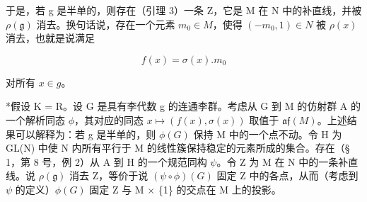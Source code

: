 于是，若 g 是半单的，则存在（引理 3）一条 Z，它是 M 在 N 中的补直线，并被 \(\rho(\mathfrak{g})\) 消去。换句话说，存在一个元素 \(m_{0} \in M\)，使得 \((-m_{0}, 1) \in N\) 被 \(\rho(x)\) 消去，也就是说满足

\[
f (x) = \sigma (x). m _ {0}\tag{2}
\]

对所有 \(x \in g\)。

*假设 K = R。设 G 是具有李代数 g 的连通李群。考虑从 G 到 M 的仿射群 A 的一个解析同态 \(\phi\)，其对应的同态 \(x \mapsto (f(x), \sigma(x))\) 取值于 \(\mathfrak{af}(M)\)。上述结果可以解释为：若 g 是半单的，则 \(\phi(G)\) 保持 M 中的一个点不动。令 H 为 GL(N) 中使 N 内所有平行于 M 的线性簇保持稳定的元素所成的集合。存在（§ 1，第 8 号，例 2）从 A 到 H 的一个规范同构 \(\psi\)。令 Z 为 M 在 N 中的一条补直线。说 \(\rho(\mathfrak{g})\) 消去 Z，等价于说 \((\psi \circ \phi)(G)\) 固定 Z 中的各点，从而（考虑到 \(\psi\) 的定义）\(\phi(G)\) 固定 Z 与 M × \{1\} 的交点在 M 上的投影。

